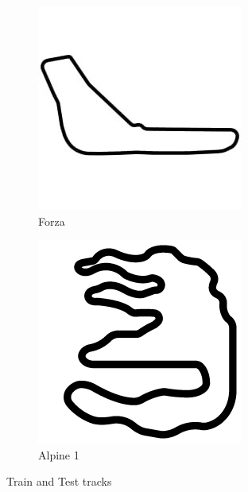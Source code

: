 \documentclass[Lau,oneside,noexaminfo]{sapthesis} %
\begin{document}
\begin{figure}[H]
\begin{subfigure}{.20\textwidth}
  \includegraphics[width=.9\linewidth]{forza}
  \caption{Forza}
  \label{forza}
\end{subfigure}
\begin{subfigure}{.20\textwidth}
  \centering
  \includegraphics[width=.9\linewidth]{alpine-1}
  \caption{Alpine 1}
  \label{alpine-1}
\end{subfigure}
\caption{Train and Test tracks}
\end{figure}
\end{document}
